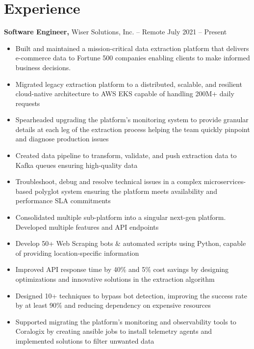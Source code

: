 \documentclass[11pt]{article}       %
\begin{document}
\section*{Experience}
\textbf{Software Engineer,} {Wiser Solutions, Inc.} -- Remote \hfill July 2021 -- Present \\
\vspace{-9pt}
\begin{itemize}
  \item Built and maintained a mission-critical data extraction platform that delivers e-commerce data to Fortune 500 companies enabling clients to make informed business decisions. \\
  \item Migrated legacy extraction platform to a distributed, scalable, and resilient cloud-native architecture to AWS EKS capable of handling 200M+ daily requests \\
  \item Spearheaded upgrading the platform's monitoring system to provide granular details at each leg of the extraction process helping the team quickly pinpoint and diagnose production issues \\
  \item Created data pipeline to transform, validate, and push extraction data to Kafka queues ensuring high-quality data \\
  \item Troubleshoot, debug and resolve technical issues in a complex microservices-based polyglot system ensuring the platform meets availability and performance SLA commitments \\
  \item Consolidated multiple sub-platform into a singular next-gen platform. Developed multiple features and API endpoints \\
  \item Develop 50+ Web Scraping bots & automated scripts using Python, capable of providing location-specific information \\
  \item Improved API response time by 40\% and 5\% cost savings by designing optimizations and innovative solutions in the extraction algorithm \\
  \item Designed 10+ techniques to bypass bot detection, improving the success rate by at least 90\% and reducing dependency on expensive resources \\
  \item Supported migrating the platform's monitoring and observability tools to Coralogix by creating ansible jobs to install telemetry agents and implemented solutions to filter unwanted data \\

\end{itemize}
\end{document}
